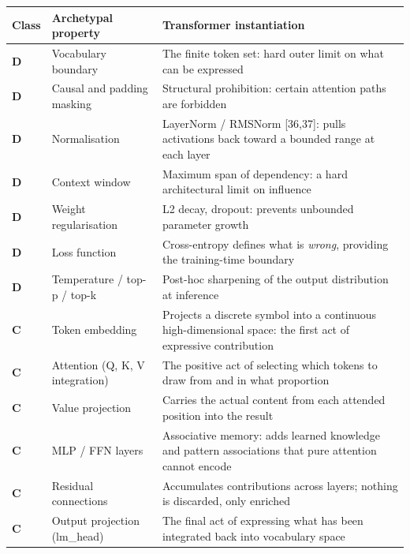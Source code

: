 \documentclass[12pt]{article}
\begin{document}
\begin{longtable}[]{@{}
  >{\raggedright\arraybackslash}p{}
  >{\raggedright\arraybackslash}p{}
  >{\raggedright\arraybackslash}p{}@{}}
\toprule\noalign{}
\begin{minipage}[b]{\linewidth}\raggedright
Class
\end{minipage} & \begin{minipage}[b]{\linewidth}\raggedright
Archetypal property
\end{minipage} & \begin{minipage}[b]{\linewidth}\raggedright
Transformer instantiation
\end{minipage} \\
\midrule\noalign{}
\endhead
\bottomrule\noalign{}
\endlastfoot
\textbf{D} & Vocabulary boundary & The finite token set: hard outer
limit on what can be expressed \\
\textbf{D} & Causal and padding masking & Structural prohibition:
certain attention paths are forbidden \\
\textbf{D} & Normalisation & LayerNorm / RMSNorm {[}36,37{]}: pulls
activations back toward a bounded range at each layer \\
\textbf{D} & Context window & Maximum span of dependency: a hard
architectural limit on influence \\
\textbf{D} & Weight regularisation & L2 decay, dropout: prevents
unbounded parameter growth \\
\textbf{D} & Loss function & Cross-entropy defines what is \emph{wrong},
providing the training-time boundary \\
\textbf{D} & Temperature / top-p / top-k & Post-hoc sharpening of the
output distribution at inference \\
\textbf{C} & Token embedding & Projects a discrete symbol into a
continuous high-dimensional space: the first act of expressive
contribution \\
\textbf{C} & Attention (Q, K, V integration) & The positive act of
selecting which tokens to draw from and in what proportion \\
\textbf{C} & Value projection & Carries the actual content from each
attended position into the result \\
\textbf{C} & MLP / FFN layers & Associative memory: adds learned
knowledge and pattern associations that pure attention cannot encode \\
\textbf{C} & Residual connections & Accumulates contributions across
layers; nothing is discarded, only enriched \\
\textbf{C} & Output projection (lm\_head) & The final act of expressing
what has been integrated back into vocabulary space \\
\end{longtable}
\end{document}
